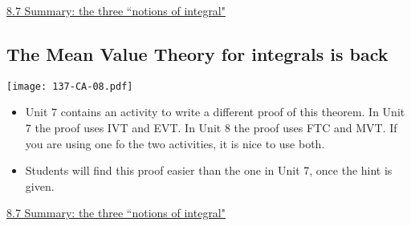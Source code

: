 \documentclass[11pt]{article}
\newcommand{\nl}{\hfill \vspace{-1.1\baselineskip}} %
\newcommand{\vvii}{\hspace{8mm} \href{https://www.youtube.com/watch?v=LBhvzrRyAtk&list=PLlwePzQY_wW_8-sITAbG_GU2JgiuwXkDN&index=7}{8.7 Summary: the three ``notions of integral"}}
\begin{document}
\begin{videos}
\vvii
\end{videos}

\newpage
\subsection{The Mean Value Theory for integrals is back}

\begin{center}
{ \texttt{[image: 137-CA-08.pdf]}} 
\end{center}

\begin{comments}
\nl
	\begin{itemize}
		\item  Unit 7 contains an activity to write a different proof of this theorem.  In Unit 7 the proof uses IVT and EVT.  In Unit 8 the proof uses FTC and MVT.  If you are using one fo the two activities, it is nice to use both.
		\item Students will find this proof easier than the one in Unit 7, once the hint is given.
	\end{itemize}
\end{comments}

\begin{videos}
\vvii
\end{videos}

\newpage
\end{document}
